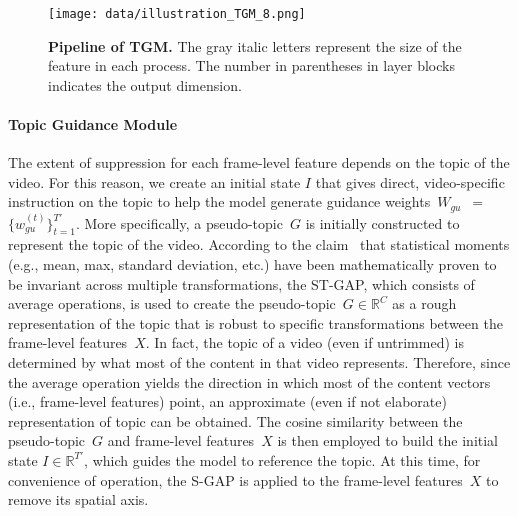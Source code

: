 \documentclass[10pt,twocolumn,letterpaper]{article}
\begin{document}
        
            \vspace{-4mm}
            
        \begin{figure}[t!]
            \centering
            \texttt{[image: data/illustration\_TGM\_8.png]} 
            \vspace{-3mm}
            \caption{\textbf{Pipeline of TGM.} The gray italic letters represent the size of the feature in each process. The number in parentheses in layer blocks indicates the output dimension. \vspace{-3mm}} \label{fig:tgm}
        \end{figure}
        \paragraph{Topic Guidance Module \\}
        
            The extent of suppression for each frame-level feature depends on the topic of the video. For this reason, we create an initial state $I$ that gives direct, video-specific instruction on the topic to help the model generate guidance weights~$W_{gu}$~$=$~$\{ w^{(t)}_{gu} \}^{T'}_{t=1}$. More specifically, a pseudo-topic~$G$ is initially constructed to represent the topic of the video. According to the claim~\cite{lin2017hnip} that statistical moments (e.g., mean, max, standard deviation, etc.) have been mathematically proven to be invariant across multiple transformations, the ST-GAP, which consists of average operations, is used to create the pseudo-topic~$G \in \mathbb{R}^{C}$ as a rough representation of the topic that is robust to specific transformations between the frame-level features~$X$. In fact, the topic of a video (even if untrimmed) is determined by what most of the content in that video represents. Therefore, since the average operation yields the direction in which most of the content vectors (i.e., frame-level features) point, an approximate (even if not elaborate) representation of topic can be obtained. The cosine similarity between the pseudo-topic~$G$ and frame-level features~$X$ is then employed to build the initial state $I \in \mathbb{R}^{T'}$, which guides the model to reference the topic. At this time, for convenience of operation, the S-GAP is applied to the frame-level features~$X$ to remove its spatial axis.
\end{document}
